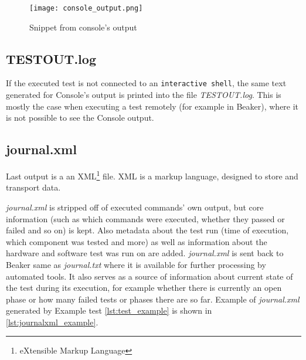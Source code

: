 \begin{figure}
  \texttt{[image: console\_output.png]}
  \caption{Snippet from console's output}
  \label{fig:console_output}
\end{figure}

\subsection{TESTOUT.log}
If the executed test is not connected to an \texttt{interactive shell}, the same text generated for Console's output is printed into the file \textit{TESTOUT.log}. This is mostly the case when executing a test remotely (for example in Beaker), where it is not possible to see the Console output.

\subsection{journal.xml}
Last output is a an XML\footnote{eXtensible Markup Language} file. XML is a markup language, designed to store and transport data.\cite{xml_intro} 

\textit{journal.xml} is stripped off of executed commands' own output, but core information (such as which commands were executed, whether they passed or failed and so on) is kept. Also metadata about the test run (time of execution, which component was tested and more) as well as information about the hardware and software test was run on are added. \textit{journal.xml} is sent back to Beaker same as \textit{journal.txt} where it is available for further processing by automated tools. It also serves as a source of information about current state of the test during its execution, for example whether there is currently an open phase or how many failed tests or phases there are so far. Example of \textit{journal.xml} generated by Example test \ref{lst:test_example} is shown in \ref{lst:journalxml_example}.

